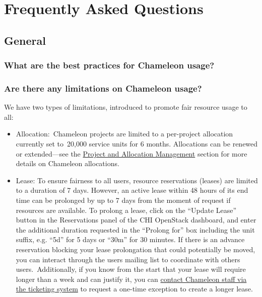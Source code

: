 \FILENAME

\chapter{Frequently Asked Questions}\label{frequently-asked-questions}

\section{General}\label{general}



\subsection{What are the best practices for Chameleon
usage?}\label{what-are-the-best-practices-for-chameleon-usage}


\subsection{Are there any limitations on Chameleon
usage?}\label{are-there-any-limitations-on-chameleon-usage}

We have two types of limitations, introduced to promote fair resource
usage to all:~

\begin{itemize}
\item
  Allocation:~Chameleon projects are limited to a per-project allocation
  currently set to~20,000 service units for 6 months. Allocations can be
  renewed or extended---see the
  \href{index.html\#toc-project-and-allocation-management}{Project and
  Allocation Management} section for more details on Chameleon
  allocations.
\item
  Lease: To ensure fairness to all users, resource reservations (leases)
  are limited to a duration of 7 days. However, an active lease within
  48 hours of its end time can be prolonged by up to 7 days from the
  moment of request if resources are available. To prolong a lease,
  click on the ``Update Lease'' button in the Reservations panel of the
  CHI OpenStack dashboard, and enter the additional duration requested
  in the ``Prolong for'' box including the unit suffix, e.g. ``5d'' for
  5 days or ``30m'' for 30 minutes. If there is an advance reservation
  blocking your lease prolongation that could potentially be moved, you
  can interact through the users mailing list to coordinate with others
  users.~Additionally, if you know from the start that your lease will
  require longer than a week and can justify it, you can
  \href{https://www.chameleoncloud.org/user/help/ticket/new/}{contact
  Chameleon staff via the ticketing system} to request a one-time
  exception to create a longer lease.
\end{itemize}

